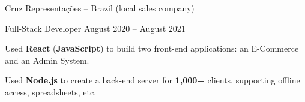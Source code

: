 \begin{entry}{Cruz Representações -- Brazil (local sales company)}

	\entryItem
		{Full-Stack Developer}
		{August 2020 -- August 2021}

		\begin{items}
			\item Used \textbf{React} (\textbf{JavaScript}) to build two front-end applications: an E-Commerce and an Admin System.
			\item Used \textbf{Node.js} to create a back-end server for \textbf{1,000+} clients, supporting offline access, spreadsheets, etc.
		\end{items}
	
\end{entry}
